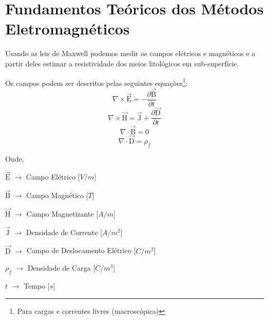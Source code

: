     
    
    \section{Fundamentos Teóricos dos Métodos Eletromagnéticos}
        Usando as leis de Maxwell \cite{eletromag8hayt} podemos medir os campos elétricos e magnéticos e a partir deles estimar a resistividade dos meios litológicos em sub-superfície.
	
        Os campos podem ser descritos pelas seguintes equações\footnote{Para cargas e correntes livres
        (macroscópica)}:
            \begin{equation}
                \label{rot_elet_max}
                \nabla \times \vec{\textrm{E}}=-\frac{\partial \vec{\textrm{B}}}{\partial t} 
            \end{equation}
            \begin{equation}
                \label{rot_mag_max}
                \nabla \times \vec{\textrm{H}} = \vec{\textrm{J}} + \frac{\partial \vec{\textrm{D}}}{\partial t}
            \end{equation}
            \begin{equation}
                \nabla \cdot \vec{\textrm{B}} = 0
            \end{equation}
            \begin{equation}
                \label{div_d}
                \nabla \cdot \vec{\textrm{D}} = \rho_f
            \end{equation}
            
            \noindent Onde,
            
            {\footnotesize \noindent $\vec{\textrm{E}}$ $\rightarrow$ Campo Elétrico [$V/m$]
	    
            \noindent $\vec{\textrm{B}}$ $\rightarrow$ Campo Magnético [$T$]
	    
            \noindent $\vec{\textrm{H}}$ $\rightarrow$ Campo Magnetizante [$A/m$]
	    
            \noindent $\vec{\textrm{J}}$ $\rightarrow$ Densidade de Corrente [$A/m^2$]
	    
            \noindent $\vec{\textrm{D}}$ $\rightarrow$ Campo de Deslocamento Elétrico [$C/m^2$]
	    
            \noindent $\rho_f$ $\rightarrow$ Densidade de Carga [$C/m^3$]
	    
            \noindent $t$ $\rightarrow$ Tempo [$s$]}

